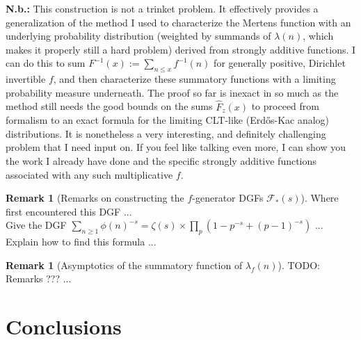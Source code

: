 \documentclass[11pt,reqno,a4letter]{article}
\numberwithin{figure}{section}
\numberwithin{table}{section}
\theoremstyle{plain}
\numberwithin{theorem}{section}
\theoremstyle{definition}
\newtheorem{remark}[theorem]{Remark}
\begin{document}
\textbf{N.b.:} This construction is not a trinket problem. It effectively provides a generalization 
of the method I used to characterize the Mertens function with an underlying probability 
distribution (weighted by summands of $\lambda(n)$, which makes it properly still a hard problem) 
derived from strongly additive functions. I can do this to sum 
$F^{-1}(x) := \sum_{n \leq x} f^{-1}(n)$ for generally positive, Dirichlet invertible $f$, and 
then characterize these summatory functions with a limiting probability measure underneath. 
The proof so far is inexact in so much as the method still needs the good bounds on 
the sums $\widehat{F}_z(x)$ to proceed from formalism to an exact formula for the 
limiting CLT-like (Erd\H{o}s-Kac analog) 
distributions. It is nonetheless a very interesting, and definitely challenging 
problem that I need input on. If you feel like talking even more, I can show you the work I 
already have done and the specific strongly additive functions associated with any such 
multiplicative $f$. 


\newpage

\begin{remark}[Remarks on constructing the $f$-generator DGFs $\mathcal{F}_{\ast}(s)$]
Where first encountered this DGF ... \\ 
Give the DGF $\sum_{n \geq 1} \phi(n)^{-s} = \zeta(s) \times \prod_p\left(1-p^{-s} + (p-1)^{-s}\right)$ ... \\ 
Explain how to find this formula ... \\ 
\end{remark}

\begin{remark}[Asymptotics of the summatory function of $\lambda_f(n)$]
TODO: Remarks ??? ... 
\end{remark}


\newpage
\section{Conclusions}
\label{Section_Conclusions} 
\end{document}
